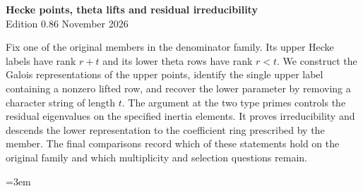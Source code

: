 \begin{center}
{\Large\bfseries Hecke points, theta lifts and residual irreducibility}\\[4pt]
Edition 0.86  November 2026
\end{center}

Fix one of the original members in the denominator family. Its upper
Hecke labels have rank $r+t$ and its lower theta rows have rank $r<t$.
We construct the Galois representations of the upper points, identify
the single upper label containing a nonzero lifted row, and recover
the lower parameter by removing a character string of length $t$.
The argument at the two type primes controls the residual eigenvalues
on the specified inertia elements. It proves irreducibility and descends
the lower representation to the coefficient ring prescribed by the
member. The final comparisons record which of these statements hold on
the original family and which multiplicity and selection questions remain.

\begingroup\emergencystretch=3em















\endgroup
